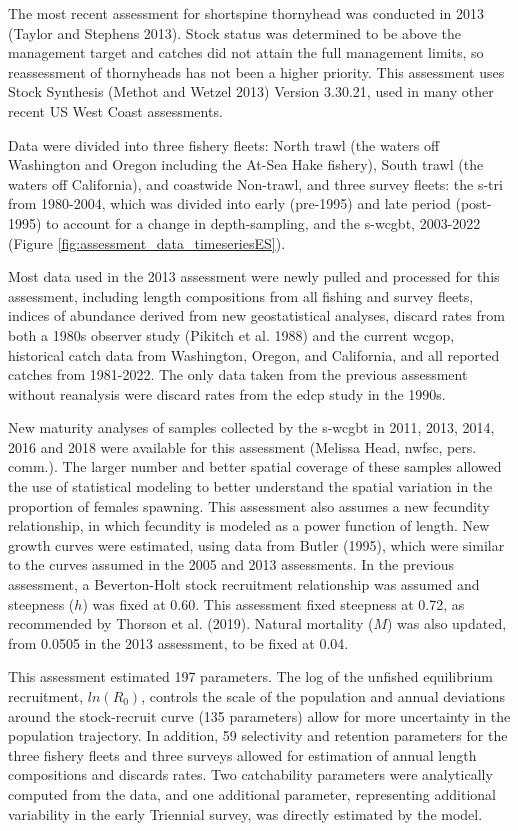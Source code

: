 \documentclass[11pt,
  english,
  letterpaper,
]{article}
\begin{document}
The most recent assessment for shortspine thornyhead was conducted in 2013 (Taylor and Stephens 2013). Stock status was determined to be above the management target and catches did not attain the full management limits, so reassessment of thornyheads has not been a higher priority. This assessment uses Stock Synthesis (Methot and Wetzel 2013) Version 3.30.21, used in many other recent US West Coast assessments.

Data were divided into three fishery fleets: North trawl (the waters off Washington and Oregon including the At-Sea Hake fishery), South trawl (the waters off California), and coastwide Non-trawl, and three survey fleets: the \gls{s-tri} from 1980-2004, which was divided into early (pre-1995) and late period (post-1995) to account for a change in depth-sampling, and the \gls{s-wcgbt}, 2003-2022 (Figure \ref{fig:assessment_data_timeseriesES}).

Most data used in the 2013 assessment were newly pulled and processed for this assessment, including length compositions from all fishing and survey fleets, indices of abundance derived from new geostatistical analyses, discard rates from both a 1980s observer study (Pikitch et al. 1988) and the current \gls{wcgop}, historical catch data from Washington, Oregon, and California, and all reported catches from 1981-2022. The only data taken from the previous assessment without reanalysis were discard rates from the \gls{edcp} study in the 1990s.

New maturity analyses of samples collected by the \gls{s-wcgbt} in 2011, 2013, 2014, 2016 and 2018 were available for this assessment (Melissa Head, \gls{nwfsc}, pers. comm.). The larger number and better spatial coverage of these samples allowed the use of statistical modeling to better understand the spatial variation in the proportion of females spawning. This assessment also assumes a new fecundity relationship, in which fecundity is modeled as a power function of length. New growth curves were estimated, using data from Butler (1995), which were similar to the curves assumed in the 2005 and 2013 assessments. In the previous assessment, a Beverton-Holt stock recruitment relationship was assumed and steepness (\(h\)) was fixed at 0.60. This assessment fixed steepness at 0.72, as recommended by Thorson et al. (2019). Natural mortality (\(M\)) was also updated, from 0.0505 in the 2013 assessment, to be fixed at 0.04.

This assessment estimated 197 parameters. The log of the unfished equilibrium recruitment, \(ln(R_0)\), controls the scale of the population and annual deviations around the stock-recruit curve (135 parameters) allow for more uncertainty in the population trajectory. In addition, 59 selectivity and retention parameters for the three fishery fleets and three surveys allowed for estimation of annual length compositions and discards rates. Two catchability parameters were analytically computed from the data, and one additional parameter, representing additional variability in the early Triennial survey, was directly estimated by the model.
\end{document}
